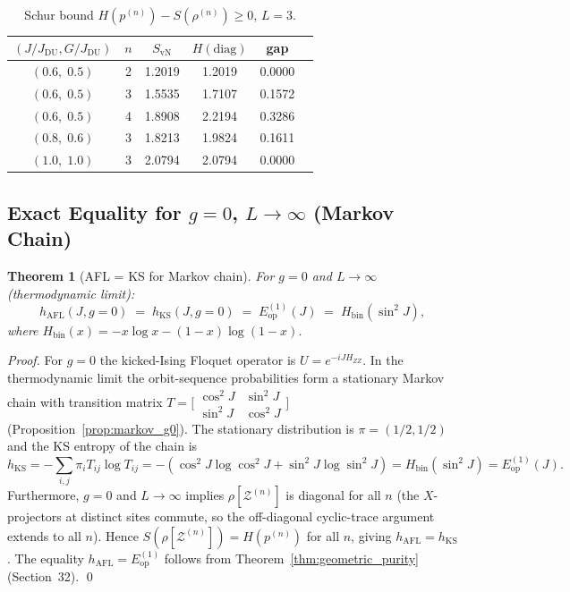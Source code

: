 \documentclass[12pt,a4paper]{article}
\newtheorem{theorem}{Theorem}[section]
\begin{document}
\begin{table}[h!]
\centering
\caption{Schur bound $H(p^{(n)})-S(\rho^{(n)})\geq 0$, $L=3$.}
\label{tab:schur}
\begin{tabular}{c|c|c|c|c|c}
$(J/J_\mathrm{DU},G/J_\mathrm{DU})$ & $n$ & $S_{\mathrm{vN}}$ & $H(\mathrm{diag})$ & gap\\
\hline
$(0.6,\;0.5)$ & 2 & 1.2019 & 1.2019 & 0.0000\\
$(0.6,\;0.5)$ & 3 & 1.5535 & 1.7107 & 0.1572\\
$(0.6,\;0.5)$ & 4 & 1.8908 & 2.2194 & 0.3286\\
$(0.8,\;0.6)$ & 3 & 1.8213 & 1.9824 & 0.1611\\
$(1.0,\;1.0)$ & 3 & 2.0794 & 2.0794 & 0.0000\\
\end{tabular}
\end{table}

\subsection{Exact Equality for $g=0$, $L\to\infty$ (Markov Chain)}
\label{sec:markov_equality}

\begin{theorem}[AFL = KS for Markov chain]
\label{thm:markov_equality}
For $g=0$ and $L\to\infty$ (thermodynamic limit):
\[
  h_{\mathrm{AFL}}(J,g{=}0)
  \;=\; h_{\mathrm{KS}}(J,g{=}0)
  \;=\; E_{\mathrm{op}}^{(1)}(J)
  \;=\; H_{\mathrm{bin}}(\sin^2 J),
\]
where $H_{\mathrm{bin}}(x)=-x\log x-(1-x)\log(1-x)$.
\end{theorem}

\begin{proof}
For $g=0$ the kicked-Ising Floquet operator is $U=e^{-iJH_{ZZ}}$.
In the thermodynamic limit the orbit-sequence probabilities form a
stationary Markov chain with transition matrix
$T=\bigl[\begin{smallmatrix}\cos^2J&\sin^2J\\\sin^2J&\cos^2J\end{smallmatrix}\bigr]$
(Proposition~\ref{prop:markov_g0}).  The stationary distribution is
$\pi=(1/2,1/2)$ and the KS entropy of the chain is
\[
  h_{\mathrm{KS}}
  =-\sum_{i,j}\pi_i T_{ij}\log T_{ij}
  =-(\cos^2J\log\cos^2J+\sin^2J\log\sin^2J)
  =H_{\mathrm{bin}}(\sin^2J)=E_{\mathrm{op}}^{(1)}(J).
\]
Furthermore, $g=0$ and $L\to\infty$ implies $\rho[\mathcal{Z}^{(n)}]$ is
diagonal for all $n$ (the $X$-projectors at distinct sites commute, so the
off-diagonal cyclic-trace argument extends to all $n$).  Hence
$S(\rho[\mathcal{Z}^{(n)}])=H(p^{(n)})$ for all $n$, giving $h_{\mathrm{AFL}}=h_{\mathrm{KS}}$.
The equality $h_{\mathrm{AFL}}=E_{\mathrm{op}}^{(1)}$ follows from
Theorem~\ref{thm:geometric_purity} (Section~32). \qed
\end{proof}
\end{document}
